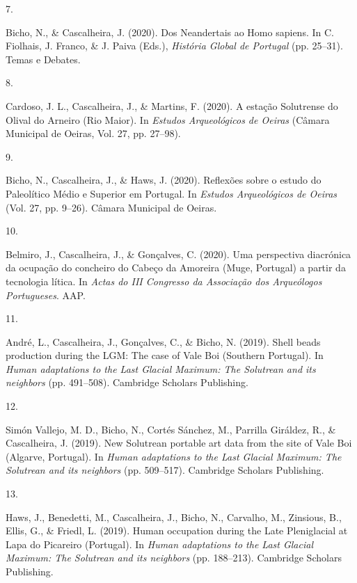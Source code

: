 \documentclass[11pt,a4paper,]{awesome-cv}
\newlength{\cslhangindent}
\newlength{\csllabelwidth}
\newenvironment{CSLReferences}[2] %
 {\begin{list}{}{%
  \setlength{\itemindent}{0pt}
  \setlength{\leftmargin}{0pt}
  \setlength{\parsep}{0pt}
  \ifodd #1
   \setlength{\leftmargin}{\cslhangindent}
   \setlength{\itemindent}{-1\cslhangindent}
  \fi
  \setlength{\itemsep}{#2\baselineskip}}}
 {\end{list}}
\newcommand{\CSLLeftMargin}[1]{\parbox[t]{\csllabelwidth}{\strut#1\strut}}
\newcommand{\CSLRightInline}[1]{\parbox[t]{\linewidth - \csllabelwidth}{\strut#1\strut}}
\begin{document}
\begin{CSLReferences}{0}{0}
\CSLLeftMargin{7. }%
\CSLRightInline{Bicho, N., \& Cascalheira, J. (2020). Dos Neandertais ao
Homo sapiens. In C. Fiolhais, J. Franco, \& J. Paiva (Eds.),
\emph{História Global de Portugal} (pp. 25--31). Temas e Debates.}

\CSLLeftMargin{8. }%
\CSLRightInline{Cardoso, J. L., Cascalheira, J., \& Martins, F. (2020).
A estação Solutrense do Olival do Arneiro (Rio Maior). In \emph{Estudos
Arqueológicos de Oeiras} (Câmara Municipal de Oeiras, Vol. 27, pp.
27--98).}

\CSLLeftMargin{9. }%
\CSLRightInline{Bicho, N., Cascalheira, J., \& Haws, J. (2020).
Reflexões sobre o estudo do Paleolítico Médio e Superior em Portugal. In
\emph{Estudos Arqueológicos de Oeiras} (Vol. 27, pp. 9--26). Câmara
Municipal de Oeiras.}

\CSLLeftMargin{10. }%
\CSLRightInline{Belmiro, J., Cascalheira, J., \& Gonçalves, C. (2020).
Uma perspectiva diacrónica da ocupação do concheiro do Cabeço da
Amoreira (Muge, Portugal) a partir da tecnologia lítica. In \emph{Actas
do III Congresso da Associação dos Arqueólogos Portugueses}. AAP.}

\CSLLeftMargin{11. }%
\CSLRightInline{André, L., Cascalheira, J., Gonçalves, C., \& Bicho, N.
(2019). Shell beads production during the LGM: The case of Vale Boi
(Southern Portugal). In \emph{Human adaptations to the Last Glacial
Maximum: The Solutrean and its neighbors} (pp. 491--508). Cambridge
Scholars Publishing.}

\CSLLeftMargin{12. }%
\CSLRightInline{Simón Vallejo, M. D., Bicho, N., Cortés Sánchez, M.,
Parrilla Giráldez, R., \& Cascalheira, J. (2019). New Solutrean portable
art data from the site of Vale Boi (Algarve, Portugal). In \emph{Human
adaptations to the Last Glacial Maximum: The Solutrean and its
neighbors} (pp. 509--517). Cambridge Scholars Publishing.}

\CSLLeftMargin{13. }%
\CSLRightInline{Haws, J., Benedetti, M., Cascalheira, J., Bicho, N.,
Carvalho, M., Zinsious, B., Ellis, G., \& Friedl, L. (2019). Human
occupation during the Late Pleniglacial at Lapa do Picareiro (Portugal).
In \emph{Human adaptations to the Last Glacial Maximum: The Solutrean
and its neighbors} (pp. 188--213). Cambridge Scholars Publishing.}


\end{CSLReferences}
\end{document}
